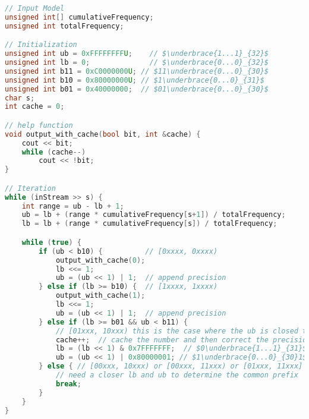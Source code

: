 \documentclass[a4paper,11pt]{article}
\begin{document}
\begin{lstlisting}[language=C++]
// Input Model
unsigned int[] cumulativeFrequency;
unsigned int totalFrequency;

// Initialization
unsigned int ub = 0xFFFFFFFFU;    // $\underbrace{1...1}_{32}$
unsigned int lb = 0;              // $\underbrace{0...0}_{32}$
unsigned int b11 = 0xC0000000U; // $11\underbrace{0...0}_{30}$
unsigned int b10 = 0x80000000U; // $1\underbrace{0...0}_{31}$
unsigned int b01 = 0x40000000;  // $01\underbrace{0...0}_{30}$
char s;
int cache = 0;

// help function
void output_with_cache(bool bit, int &cache) {
	cout << bit;
	while (cache--)
		cout << !bit;
}

// Iteration
while (inStream >> s) {
	int range = ub - lb + 1;
	ub = lb + (range * cumulativeFrequency[s+1]) / totalFrequency;
	lb = lb + (range * cumulativeFrequency[s]) / totalFrequency;

	while (true) {
		if (ub < b10) {	         // [0xxxx, 0xxxx)
			output_with_cache(0);
			lb <<= 1;
			ub = (ub << 1) | 1;  // append precision
		} else if (lb >= b10) {	 // [1xxxx, 1xxxx)
			output_with_cache(1);
			lb <<= 1;
			ub = (ub << 1) | 1;  // append precision
		} else if (lb >= b01 && ub < b11) {
			// [01xxx, 10xxx) this is the case where the ub is closed to the lb
			cache++;  // cache the number and then correct the precision
			lb = (lb << 1) & 0x7FFFFFFF;  // $0\underbrace{1...1}_{31}$
			ub = (ub << 1) | 0x80000001; // $1\underbrace{0...0}_{30}1$
		} else { // [00xxx, 10xxx) or [00xxx, 11xxx) or [01xxx, 11xxx]
			// need a closer lb and ub to determine the common prefix
			break;
		}
	}
}
\end{lstlisting}


 
\end{document}
